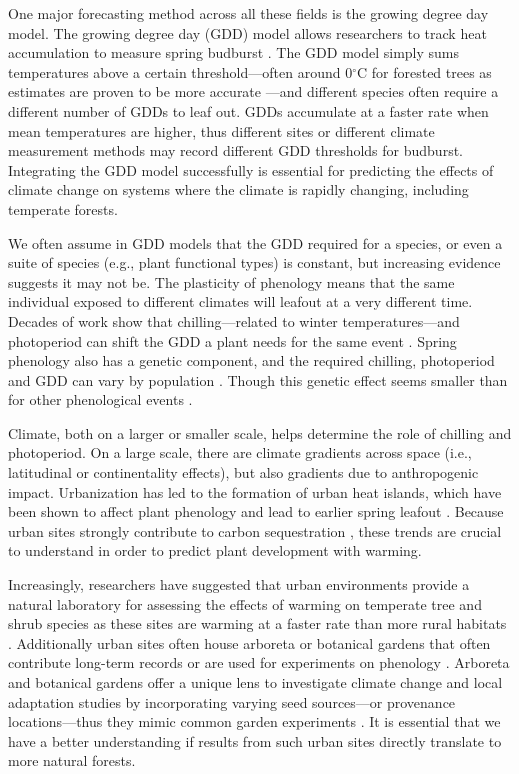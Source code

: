 \documentclass{article}\usepackage[]{graphicx}\usepackage[]{color}
\begin{document}
One major forecasting method across all these fields is the growing degree day model. The growing degree day (GDD) model allows researchers to track heat accumulation to measure spring budburst \citep{Cook2012,Crimmins2020,Phillimore2013,Schwartz2006,Vitasse2011}. The GDD model simply sums temperatures above a certain threshold---often around 0$^{\circ}$C for forested trees as estimates are proven to be more accurate \citep{Man2010}---and different species often require a different number of GDDs to leaf out. GDDs accumulate at a faster rate when mean temperatures are higher, thus different sites or different climate measurement methods may record different GDD thresholds for budburst. Integrating the GDD model successfully is essential for predicting the effects of climate change on systems where the climate is rapidly changing, including temperate forests. 
  
We often assume in GDD models that the GDD required for a species, or even a suite of species (e.g., plant functional types) is constant, but increasing evidence suggests it may not be. The plasticity of phenology means that the same individual exposed to different climates will leafout at a very different time. Decades of work show that chilling---related to winter temperatures---and photoperiod can shift the GDD a plant needs for the same event \citep{Basler2012,Chuine2010,Zohner2016}. Spring phenology also has a genetic component, and the required chilling, photoperiod and GDD can vary by population \citep{Scotti2004,Cuervo-Alarcon2018}. Though this genetic effect seems smaller than for other phenological events \citep{McKown2013,Satake2013}.

Climate, both on a larger or smaller scale, helps determine the role of chilling and photoperiod. On a large scale, there are climate gradients across space (i.e., latitudinal or continentality effects), but also gradients due to anthropogenic impact. Urbanization has led to the formation of urban heat islands, which have been shown to affect plant phenology and lead to earlier spring leafout \citep{Meng2020}. Because urban sites strongly contribute to carbon sequestration \citep{Ziter2018}, these trends are crucial to understand in order to predict plant development with warming. 
  
Increasingly, researchers have suggested that urban environments provide a natural laboratory for assessing the effects of warming on temperate tree and shrub species as these sites are warming at a faster rate than more rural habitats \citep{Pickett2011, Grimm2008}. Additionally urban sites often house arboreta or botanical gardens that often contribute long-term records \citep{Zohner2014} or are used for experiments on phenology \citep{Ettinger2018}. Arboreta and botanical gardens offer a unique lens to investigate climate change and local adaptation studies by incorporating varying seed sources---or provenance locations---thus they mimic common garden experiments \citep{Primack2009}. It is essential that we have a better understanding if results from such urban sites directly translate to more natural forests. 
  
\end{document}
